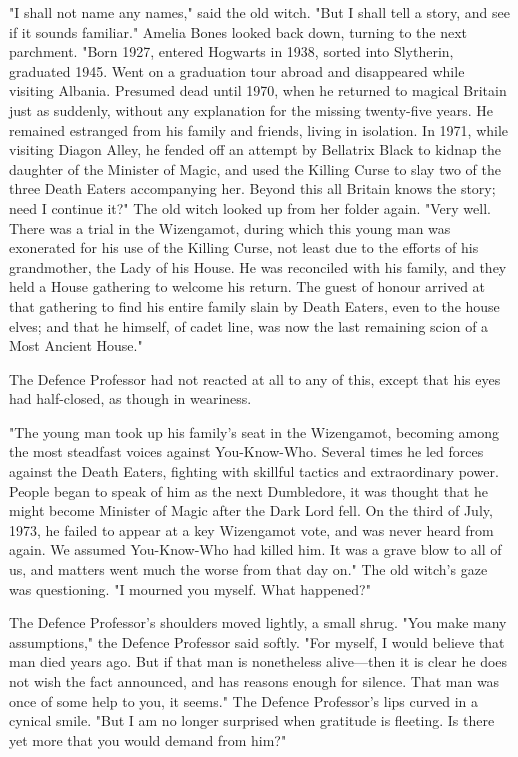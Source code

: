 "I shall not name any names," said the old witch. "But I shall tell a story,
and see if it sounds familiar." Amelia Bones looked back down, turning to the
next parchment. "Born 1927, entered Hogwarts in 1938, sorted into Slytherin,
graduated 1945. Went on a graduation tour abroad and disappeared while visiting
Albania. Presumed dead until 1970, when he returned to magical Britain just as
suddenly, without any explanation for the missing twenty-five years. He
remained estranged from his family and friends, living in isolation. In 1971,
while visiting Diagon Alley, he fended off an attempt by Bellatrix Black to
kidnap the daughter of the Minister of Magic, and used the Killing Curse to
slay two of the three Death Eaters accompanying her. Beyond this all Britain
knows the story; need I continue it?" The old witch looked up from her folder
again. "Very well. There was a trial in the Wizengamot, during which this young
man was exonerated for his use of the Killing Curse, not least due to the
efforts of his grandmother, the Lady of his House. He was reconciled with his
family, and they held a House gathering to welcome his return. The guest of
honour arrived at that gathering to find his entire family slain by Death
Eaters, even to the house elves; and that he himself, of cadet line, was now
the last remaining scion of a Most Ancient House."

The Defence Professor had not reacted at all to any of this, except that his
eyes had half-closed, as though in weariness.

"The young man took up his family's seat in the Wizengamot, becoming among the
most steadfast voices against You-Know-Who. Several times he led forces against
the Death Eaters, fighting with skillful tactics and extraordinary power.
People began to speak of him as the next Dumbledore, it was thought that he
might become Minister of Magic after the Dark Lord fell. On the third of July,
1973, he failed to appear at a key Wizengamot vote, and was never heard from
again. We assumed You-Know-Who had killed him. It was a grave blow to all of
us, and matters went much the worse from that day on." The old witch's gaze was
questioning. "I mourned you myself. What happened?"

The Defence Professor's shoulders moved lightly, a small shrug. "You make many
assumptions," the Defence Professor said softly. "For myself, I would believe
that man died years ago. But if that man is nonetheless alive---then it is
clear he does not wish the fact announced, and has reasons enough for silence.
That man was once of some help to you, it seems." The Defence Professor's lips
curved in a cynical smile. "But I am no longer surprised when gratitude is
fleeting. Is there yet more that you would demand from him?"

